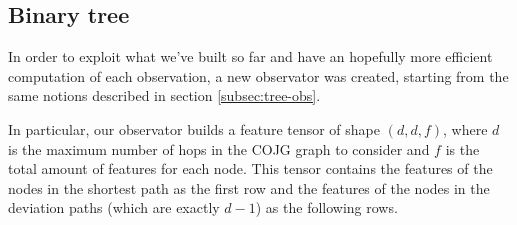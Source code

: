 \documentclass[a4paper,10pt]{report}
\begin{document}
\subsection{Binary tree}
In order to exploit what we've built so far and have an hopefully more efficient computation of each observation, a new observator was created, starting from the same notions described in section \ref{subsec:tree-obs}. 

In particular, our observator builds a feature tensor of shape $(d, d, f)$, where $d$ is the maximum number of hops in the COJG graph to consider and $f$ is the total amount of features for each node. This tensor contains the features of the nodes in the shortest path as the first row and the features of the nodes in the deviation paths (which are exactly $d-1$) as the following rows.
\end{document}
